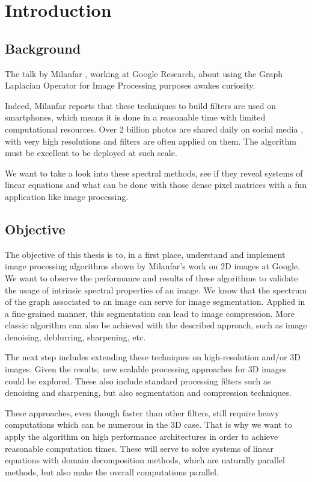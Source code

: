 \chapter{Introduction}

\section{Background}

The talk by Milanfar \cite{siam_slides_2016}, working at Google Research, about using the Graph Laplacian Operator for Image Processing purposes awakes curiosity.

Indeed, Milanfar reports that these techniques to build filters are used on smartphones, which means it is done in a reasonable time with limited computational resources.
Over 2 billion photos are shared daily on social media \cite{siam_slides_2016}, with very high resolutions and filters are often applied on them.
The algorithm must be excellent to be deployed at such scale.

We want to take a look into these spectral methods, see if they reveal systems of linear equations and what can be done with those dense pixel matrices with a fun application like image processing.

\section{Objective}

The objective of this thesis is to, in a first place, understand and implement image processing algorithms shown by Milanfar's work on 2D images at Google.
We want to observe the performance and results of these algorithms to validate the usage of intrinsic spectral properties of an image.
We know that the spectrum of the graph associated to an image can serve for image segmentation.
Applied in a fine-grained manner, this segmentation can lead to image compression.
More classic algorithm can also be achieved with the described approach, such as image denoising, deblurring, sharpening, etc.

The next step includes extending these techniques on high-resolution and/or 3D images.
Given the results, new scalable processing approaches for 3D images could be explored.
These also include standard processing filters such as denoising and sharpening, but also segmentation and compression techniques.

These approaches, even though faster than other filters, still require heavy computations which can be numerous in the 3D case.
That is why we want to apply the algorithm on high performance architectures in order to achieve reasonable computation times.
These will serve to solve systems of linear equations with domain decomposition methods, which are naturally parallel methods, but also make the overall computations parallel.


